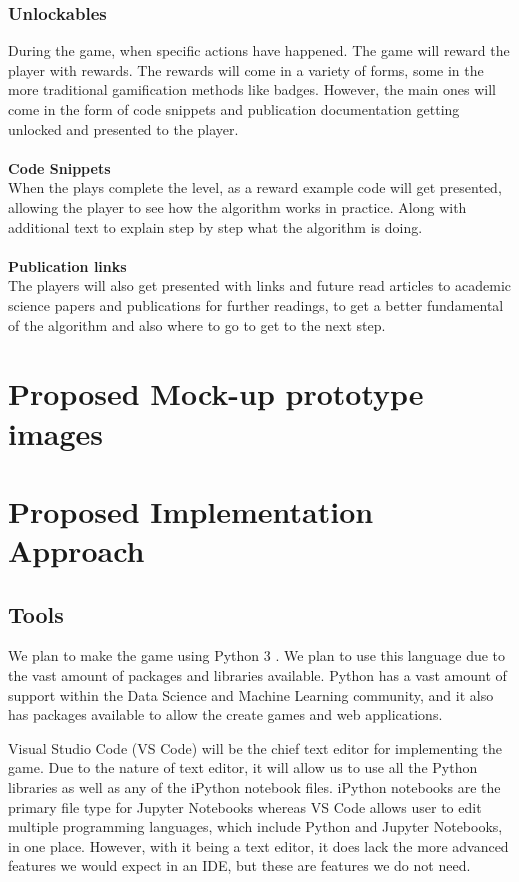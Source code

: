 \documentclass[a4paper,10pt]{article}
\begin{document}
\subsubsection{Unlockables}
During the game, when specific actions have happened. The game will reward the player with rewards. The rewards will come in a variety of forms, some in the more traditional gamification methods like badges. However, the main ones will come in the form of code snippets and publication documentation getting unlocked and presented to the player. \\
 \\
\textbf{Code Snippets}\\
When the plays complete the level, as a reward example code will get presented, allowing the player to see how the algorithm works in practice. Along with additional text to explain step by step what the algorithm is doing. \\
 \\
\textbf{Publication links}\\
The players will also get presented with links and future read articles to academic science papers and publications for further readings, to get a better fundamental of the algorithm and also where to go to get to the next step.

\section{Proposed Mock-up prototype images}


\section{Proposed Implementation Approach}
\subsection{Tools}
We plan to make the game using Python 3 \cite{reference here}. We plan to use this language due to the vast amount of packages and libraries available. Python has a vast amount of support within the Data Science and Machine Learning community, and it also has packages available to allow the create games and web applications. 

Visual Studio Code (VS Code) will be the chief text editor for implementing the game. Due to the nature of text editor, it will allow us to use all the Python libraries as well as any of the iPython notebook files. iPython notebooks are the primary file type for Jupyter Notebooks whereas VS Code allows user to edit multiple programming languages, which include Python and Jupyter Notebooks, in one place. However, with it being a text editor, it does lack the more advanced features we would expect in an IDE, but these are features we do not need.  
\end{document}
